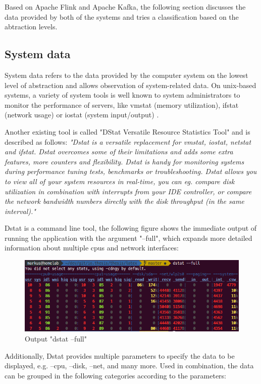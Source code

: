 Based on Apache Flink and Apache Kafka, the following section discusses the data provided
by both of the systems and tries a classification based on the abtraction levels.

\subsection{System data}

System data refers to the data provided by the computer system on the lowest level of
abstraction and allows observation of system-related data. On unix-based systems, a
variety of system tools is well known to system administrators to monitor the performance
of servers, like vmstat (memory utilization), ifstat (network usage) or iostat (system
input/output) \cite{Hoeb12}.

Another existing tool is called "DStat Versatile Resource Statistics Tool" and is described
as follows: \textit{"Dstat is a versatile replacement for vmstat, iostat, netstat and ifstat. Dstat
overcomes some of their limitations and adds some extra features, more counters and flexibility.
Dstat is handy for monitoring systems during performance tuning tests, benchmarks
or troubleshooting. Dstat allows you to view all of your system resources in real-time, you
can eg. compare disk utilization in combination with interrupts from your IDE controller,
or compare the network bandwidth numbers directly with the disk throughput (in the same
interval)."}\cite{Wieers16}

Dstat is a command line tool, the following figure shows the immediate output of running
the application with the argument "--full", which expands more detailed information about
multiple cpus and network interfaces:

\begin{figure}[H]
	\centering
	\includegraphics[width=1.0\textwidth]{../images/06-dstat-full.png}
	\caption{Output "dstat --full"}
	\label{dstat-output}
\end{figure}

Additionally, Dstat provides multiple parameters to specify the data to be displayed, e.g.
--cpu, --disk, --net, and many more. Used in combination, the data can be grouped in the
following categories according to the parameters:

